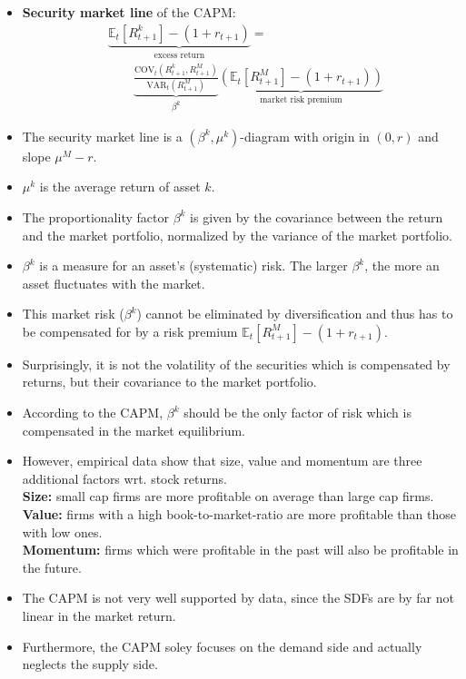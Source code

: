 \documentclass[a4paper,landscape,7pt,fleqn]{scrartcl}
\renewcommand{\emph}[1]{\textbf{#1}}
\begin{document}
\begin{multicols*}{3}
\begin{itemize}
\item \emph{Security market line} of the CAPM:
\begin{align*}
& \underbrace{\mathbb{E}_t[R_{t+1}^k]-(1+r_{t+1})}_\text{excess return} = \\
& \qquad \underbrace{\frac{\text{COV}_t(R_{t+1}^k,R_{t+1}^M)}{\text{VAR}_t(R_{t+1}^M)}}_{\beta^k} \underbrace{\left( \mathbb{E}_t[R_{t+1}^M] - (1+r_{t+1}) \right)}_\text{market risk premium}
\end{align*}
\item The security market line is a $(\beta^k,\mu^k)$-diagram with origin in $(0,r)$ and slope $\mu^M-r$.
\item $\mu^k$ is the average return of asset $k$.
\item The proportionality factor $\beta^k$ is given by the covariance between the return and the market portfolio, normalized by the variance of the market portfolio.
\item $\beta^k$ is a measure for an asset's (systematic) risk. The larger $\beta^k$, the more an asset fluctuates with the market.
\item This market risk ($\beta^k$) cannot be eliminated by diversification and thus has to be compensated for by a risk premium $\mathbb{E}_t \left[ R_{t+1}^M \right] - (1+r_{t+1})$.
\item Surprisingly, it is not the volatility of the securities which is compensated by returns, but their covariance to the market portfolio.
\item According to the CAPM, $\beta^k$ should be the only factor of risk which is compensated in the market equilibrium.
\item However, empirical data show that size, value and momentum are three additional factors wrt. stock returns. \\
\emph{Size:} small cap firms are more profitable on average than large cap firms. \\
\emph{Value:} firms with a high book-to-market-ratio are more profitable than those with low ones. \\
\emph{Momentum:} firms which were profitable in the past will also be profitable in the future.
\item The CAPM is not very well supported by data, since the SDFs are by far not linear in the market return.
\item Furthermore, the CAPM soley focuses on the demand side and actually neglects the supply side.
\end{itemize}


\end{multicols*}
\end{document}

